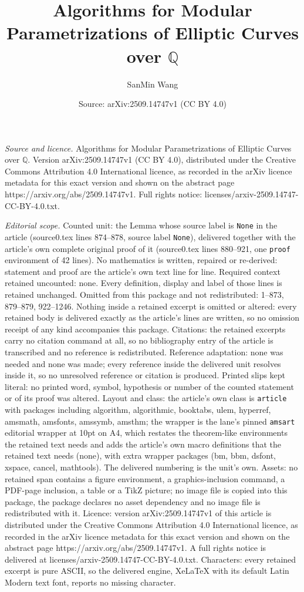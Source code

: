 \documentclass[10pt,a4paper]{amsart}
\title[Algorithms for Modular Parametrizations of Elliptic Curves o]{Algorithms for Modular Parametrizations of Elliptic Curves over $\mathbb{Q}$}
\author{SanMin Wang}
\date{Source: arXiv:2509.14747v1 (CC BY 4.0)}
\begin{document}
\maketitle

\noindent\emph{Source and licence.} Algorithms for Modular Parametrizations of Elliptic Curves over $\mathbb{Q}$. Version arXiv:2509.14747v1 (CC BY 4.0), distributed under the Creative Commons Attribution 4.0 International licence, as recorded in the arXiv licence metadata for this exact version and shown on the abstract page https://arxiv.org/abs/2509.14747v1. Full rights notice: licenses/arxiv-2509.14747-CC-BY-4.0.txt.\par\smallskip

\noindent\textit{Editorial scope.} Counted unit: the Lemma whose source label is \texttt{None} in the article (source0.tex lines 874--878, source label \texttt{None}), delivered together with the article's own complete original proof of it (source0.tex lines 880--921, one \texttt{proof} environment of 42 lines). No mathematics is written, repaired or re-derived: statement and proof are the article's own text line for line. Required context retained uncounted: none. Every definition, display and label of those lines is retained unchanged. Omitted from this package and not redistributed: 1--873, 879--879, 922--1246. Nothing inside a retained excerpt is omitted or altered: every retained body is delivered exactly as the article's lines are written, so no omission receipt of any kind accompanies this package. Citations: the retained excerpts carry no citation command at all, so no bibliography entry of the article is transcribed and no reference is redistributed. Reference adaptation: none was needed and none was made; every reference inside the delivered unit resolves inside it, so no unresolved reference or citation is produced. Printed slips kept literal: no printed word, symbol, hypothesis or number of the counted statement or of its proof was altered. Layout and class: the article's own class is \texttt{article} with packages including algorithm, algorithmic, booktabs, ulem, hyperref, amsmath, amsfonts, amssymb, amsthm; the wrapper is the lane's pinned \texttt{amsart} editorial wrapper at 10pt on A4, which restates the theorem-like environments the retained text needs and adds the article's own macro definitions that the retained text needs (none), with extra wrapper packages (bm, bbm, dsfont, xspace, cancel, mathtools). The delivered numbering is the unit's own. Assets: no retained span contains a figure environment, a graphics-inclusion command, a PDF-page inclusion, a table or a TikZ picture; no image file is copied into this package, the package declares no asset dependency and no image file is redistributed with it. Licence: version arXiv:2509.14747v1 of this article is distributed under the Creative Commons Attribution 4.0 International licence, as recorded in the arXiv licence metadata for this exact version and shown on the abstract page https://arxiv.org/abs/2509.14747v1. A full rights notice is delivered at licenses/arxiv-2509.14747-CC-BY-4.0.txt. Characters: every retained excerpt is pure ASCII, so the delivered engine, XeLaTeX with its default Latin Modern text font, reports no missing character.
\end{document}
